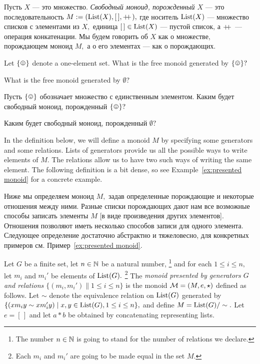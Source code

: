 \documentclass[CT4S-EN-RU]{subfiles}
\begin{document}
\begin{definitionRUS}\label{def:free monoid}
Пусть $X$ — это множество. {\em Свободный моноид, порожденный $X$} — это последовательность $M:=(\operatorname{List}(X),[\,],+\!\!+\hspace{1pt}),$ где носитель $\operatorname{List}(X)$ — множество списков с элементами из $X,$ единица $[\,]\in\operatorname{List}(X)$ — пустой список, а $+\!\!+\hspace{1pt}$ — операция конкатенации. Мы будем говорить об $X$ как о множестве, порождающем моноид $M,$ а о его элементах — как о порождающих.
\end{definitionRUS}

\begin{exerciseENG}
Let $\singleton$ denote a one-element set.
\sexc What is the free monoid generated by $\singleton?$
\item What is the free monoid generated by $\emptyset?$
\endsexc
\end{exerciseENG}

\begin{exerciseRUS}
Пусть $\singleton$ обозначает множество с единственным элементом.
\sexc Каким будет свободный моноид, порожденный $\singleton?$
\item Каким будет свободный моноид, порожденный $\emptyset?$
\endsexc
\end{exerciseRUS}

\begin{blockENG}
In the definition below, we will define a monoid $M$ by specifying some generators and some relations. Lists of generators provide us all the possible ways to write elements of $M.$ The relations allow us to have two such ways of writing the same element. The following definition is a bit dense, so see Example~\ref{ex:presented monoid} for a concrete example.
\end{blockENG}

\begin{blockRUS}
Ниже мы определяем моноид $M,$ задав определенные порождающие и некоторые отношения между ними. Разные списки порождающих дают нам все возможные способы записать элементы $M$ [в виде произведения других элементов]. Отношения позволяют иметь несколько способов записи для одного элемента.%
Следующее определение достаточно абстрактно и тяжеловесно, для конкретных примеров см. Пример~\ref{ex:presented monoid}.
\end{blockRUS}

\begin{definitionENG}\label{def:presented monoid}
Let $G$ be a finite set, let $n\in{\mathbb N}$ be a natural number,%
\footnote{The number $n\in{\mathbb N}$ is going to stand for the number of relations we declare.}
and for each $1\leq i\leq n,$ let $m_i$ and $m_i'$ be elements of $\operatorname{List}(G).$%
\footnote{Each $m_i$ and $m_i'$ are going to be made equal in the set $M.$}
The {\em monoid presented by generators $G$ and relations $\{(m_i,m_i')\|1\leq i\leq n\}$} is the monoid $\mathcal{M}=(M,e,\star)$ defined as follows. Let $\sim$ denote the equivalence relation on $\operatorname{List}(G)$ generated by $\{(xm_iy\sim xm_i'y){\;|\;}x,y\in\operatorname{List}(G), 1\leq i\leq n\},$ and define $M=\operatorname{List}(G)/\sim.$ Let $e=[\,]$ and let $a * b$ be obtained by concatenating representing lists.
\end{definitionENG}
\end{document}
